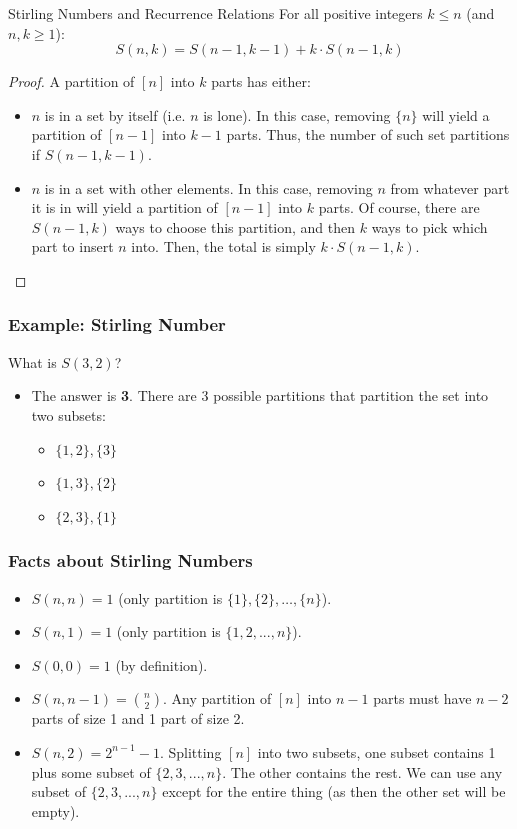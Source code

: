 \documentclass[letterpaper]{article}
\begin{document}
\begin{theorem}{Stirling Numbers and Recurrence Relations}{}
    For all positive integers $k \leq n$ (and $n, k \geq 1$):
    \[S(n, k) = S(n - 1, k - 1) + k \cdot S(n - 1, k)\]
\end{theorem}
\begin{proof}
    A partition of $[n]$ into $k$ parts has either:
    \begin{itemize}
        \item $n$ is in a set by itself (i.e. $n$ is lone). In this case, removing $\{n\}$ will yield a partition of $[n - 1]$ into $k - 1$ parts. Thus, the number of such set partitions if $S(n - 1, k - 1)$. 
        \item $n$ is in a set with other elements. In this case, removing $n$ from whatever part it is in will yield a partition of $[n - 1]$ into $k$ parts. Of course, there are $S(n - 1, k)$ ways to choose this partition, and then $k$ ways to pick which part to insert $n$ into. Then, the total is simply $k \cdot S(n - 1, k)$. \qedhere 
    \end{itemize}
\end{proof}

\subsubsection{Example: Stirling Number}
What is $S(3, 2)$? 
\begin{itemize}
    \item The answer is \textbf{3}. There are 3 possible partitions that partition the set into two subsets:
    \begin{itemize}
        \item $\{1, 2\}, \{3\}$
        \item $\{1, 3\}, \{2\}$
        \item $\{2, 3\}, \{1\}$
    \end{itemize}
\end{itemize}


\subsubsection{Facts about Stirling Numbers}
\begin{itemize}
    \item $S(n, n) = 1$ (only partition is $\{1\}, \{2\}, \dots, \{n\}$).
    \item $S(n, 1) = 1$ (only partition is $\{1, 2, ..., n\}$).
    \item $S(0, 0) = 1$ (by definition).
    \item $S(n, n - 1) = \binom{n}{2}$.
    Any partition of $[n]$ into $n - 1$ parts must have $n - 2$ parts of size 1 and 1 part of size 2.
    \item $S(n, 2) = 2^{n - 1} - 1$. 
    Splitting $[n]$ into two subsets, one subset contains 1 plus some subset of $\{2, 3, ..., n\}$. The other contains the rest. We can use any subset of $\{2, 3, ..., n\}$ except for the entire thing (as then the other set will be empty). 
\end{itemize}
\end{document}
